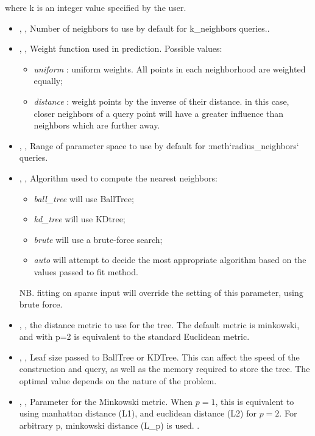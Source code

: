where k is an integer value specified by the user.
%
\begin{itemize}
  \item {}, ,
  Number of neighbors to use by default for k\_neighbors queries..
  \item {}, ,
  Weight function used in prediction.
  Possible values:
\begin{itemize}
    \item \textit{uniform} : uniform weights.
    All points in each neighborhood are weighted equally;
    \item \textit{distance} : weight points by the inverse of their distance.
    in this case, closer neighbors of a query point will have a greater
    influence than neighbors which are further away.
\end{itemize}

  \item {}, ,
  Range of parameter space to use by default for :meth`radius\_neighbors`
  queries.
  \item {}, ,
  Algorithm used to compute the nearest neighbors:
\begin{itemize}
    \item \textit{ball\_tree} will use BallTree;
    \item \textit{kd\_tree} will use KDtree;
    \item \textit{brute} will use a brute-force search;
    \item \textit{auto} will attempt to decide the most appropriate algorithm
    based on the values passed to fit method.
\end{itemize}
  NB.
  fitting on sparse input will override the setting of this parameter, using
  brute force.
  \item {}, ,
  the distance metric to use for the tree.
  The default metric is minkowski, and with p=2 is equivalent to the standard
  Euclidean metric.
  \item {}, ,
  Leaf size passed to BallTree or KDTree.
  This can affect the speed of the construction and query, as well as the memory
  required to store the tree.
  The optimal value depends on the nature of the problem.
  \item {}, ,
  Parameter for the Minkowski metric.
  When $p = 1$, this is equivalent to using manhattan distance (L1), and
  euclidean distance (L2) for $p = 2$.
  For arbitrary p, minkowski distance (L\_p) is used.
  .
\end{itemize}
